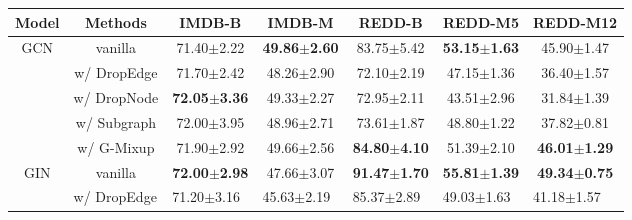 \begin{table}[H]
\centering
\footnotesize
\begin{tabular}{ccccccc}
\hline
Model                & Methods                         & IMDB-B                          & IMDB-M                                   & REDD-B                          & REDD-M5                         & REDD-M12                        \\ \hline
\multirow{5}{*}{GCN} & vanilla                         & 71.40$\pm$2.22                     & \textbf{49.86}$\pm$\textbf{2.60}                     & 83.75$\pm$5.42                     & \textbf{53.15}$\pm$\textbf{1.63}          & 45.90$\pm$1.47                     \\
                     & w/ DropEdge                     & 71.70$\pm$2.42                     & 48.26$\pm$2.90                              & 72.10$\pm$2.19                     & 47.15$\pm$1.36                     & 36.40$\pm$1.57                     \\
                     & w/ DropNode                     & \textbf{72.05}$\pm$\textbf{3.36}          & 49.33$\pm$2.27                             & 72.95$\pm$2.11                     & 43.51$\pm$2.96                     & 31.84$\pm$1.39                     \\
                     & w/ Subgraph                     & 72.00$\pm$3.95                     & 48.96$\pm$2.71                              & 73.61$\pm$1.87                     & 48.80$\pm$1.22                    & 37.82$\pm$0.81                     \\
                     & w/ G-Mixup                      & 71.90$\pm$2.92                     & 49.66$\pm$2.56                              & \textbf{84.80}$\pm$\textbf{4.10}      &         51.39$\pm$2.10                     & \textbf{46.01}$\pm$\textbf{1.29}            \\ \hline
\multirow{5}{*}{GIN} & vanilla                         & \textbf{72.00}$\pm$\textbf{2.98}            & 47.66$\pm$3.07                              & \textbf{91.47}$\pm$\textbf{1.70}            & \textbf{55.81}$\pm$\textbf{1.39}            & \textbf{49.34}$\pm$\textbf{0.75}            \\
                     & \multicolumn{1}{l}{w/ DropEdge} & \multicolumn{1}{l}{71.20$\pm$3.16} & \multicolumn{1}{l}{45.63$\pm$2.19}          & \multicolumn{1}{l}{85.37$\pm$2.89} & \multicolumn{1}{l}{49.03$\pm$1.63} & \multicolumn{1}{l}{41.18$\pm$1.57} \\

\end{tabular}
\end{table}
